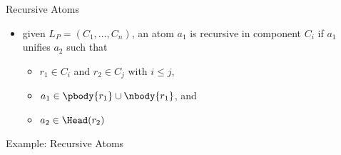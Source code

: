 

\begin{frame}{Recursive Atoms}
  \vfill
  \begin{itemize}
    \item given \(L_P = (C_1, \dots, C_n)\), an atom \(a_1\) is \alert{recursive} in component \(C_i\) if \(a_1\) unifies \(a_2\) such that
      \begin{itemize}
        \item \(r_1 \in C_i\) and \(r_2 \in C_j\) with \(i \leq j\),
        \item \(a_1 \in \pbody{r_1}\cup\nbody{r_1}\), and
        \item \(a_2 \in \Head(r_2)\)
      \end{itemize}
  \end{itemize}
\end{frame}

\begin{frame}{Example: Recursive Atoms}
  \vfill
  \begin{center}
  \DepGraph[\alert]
  \end{center}
\end{frame}

